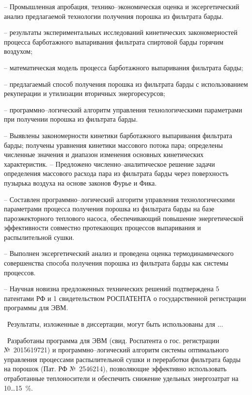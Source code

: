-- Промышленная апробация, технико--экономическая оценка и эксергетический анализ предлагаемой технологии получения порошка из фильтрата барды.



-- результаты экспериментальных исследований кинетических закономерностей процесса барботажного выпаривания фильтрата спиртовой
барды горячим воздухом;

-- математическая модель процесса барботажного  выпаривания фильтрата барды;

-- предлагаемый способ получения порошка из фильтрата барды с использованием рекуперации и утилизации вторичных энергоресурсов;

-- программно--логический алгоритм управления технологическими параметрами при получении порошка из фильтрата барды.

\novelty

-- Выявлены закономерности кинетики барботажного выпаривания фильтрата барды; получены уравнения кинетики массового потока пара; определены численные значения и диапазон изменения основных кинетических характеристик.
-- Предложено численно--аналитическое решение задачи определения массового расхода пара из фильтрата барды через поверхность пузырька воздуха на
основе законов Фурье и Фика.

-- Составлен программно--логический алгоритм управления технологическими параметрами процесса получения порошка из фильтрата барды на базе пароэжекторного теплового насоса, обеспечивающий повышение энергетической эффективности совместно протекающих процессов выпаривания и распылительной сушки.

-- Выполнен эксергетический анализ и проведена оценка термодинамического совершенства способа получения порошка из фильтрата барды как системы процессов.

-- Научная новизна предложенных технических решений подтверждена 5 патентами РФ и 1 свидетельством РОСПАТЕНТА о государственной регистрации программы для ЭВМ.


\influence\ Результаты, изложенные в диссертации, могут быть использованы для ...


\reliability\ Разработаны программа для ЭВМ (свид. Роспатента о гос. регистрации №~2015619721) и программно--логический алгоритм  системы оптимального управления процессами распылительной сушки и переработки фильтрата барды на порошок (Пат. РФ №~2546214), позволяющие эффективно использовать отработанные теплоносители и обеспечить снижение удельных энергозатрат на 10\ldots15~\%.

